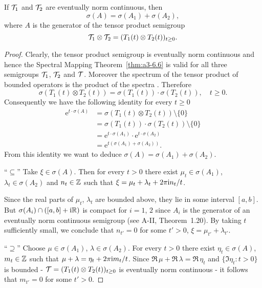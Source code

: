 \begin{corollary}\label{cor:a3-6.8}
If $\mathcal{T}_{1}$ and $\mathcal{T}_{2}$ are eventually norm continuous, then
\[
	\sigma(A) = \sigma(A_{1}) + \sigma(A_{2}) ,
\]
where $A$ is the generator of the tensor product semigroup
\[
	\mathcal{T}_{1} \otimes \mathcal{T}_{2} = (T_{1}(t) \otimes T_{2}(t))_{t\geq 0} .
\]
\end{corollary}
\begin{proof}
Clearly, the tensor product semigroup is eventually norm continuous and hence the Spectral Mapping Theorem~\ref{thm:a3-6.6} is valid for all three semigroups $\mathcal{T}_{1}$, $\mathcal{T}_{2}$ and $\mathcal{T}$.
Moreover the spectrum of the tensor product of bounded operators is the product of the spectra \citet[XIII.9]{reedsimon:1978}.
Therefore
\[
	\sigma(T_{1}(t)\otimes T_{2}(t)) = \sigma(T_{1}(t))\cdot\sigma(T_{2}(t)), \quad t \geq 0 .
\]
Consequently we have the following identity for every $t \geq 0$ 
\begin{align*}
\mathrm{e}^{t\cdot\sigma(A)} &= \sigma(T_{1}(t)\otimes T_{2}(t)) \setminus \{0\} \\
&= \sigma(T_{1}(t))\cdot\sigma(T_{2}(t)) \setminus \{0\} \\
&= \mathrm{e}^{t\cdot\sigma(A_{1})}\cdot \mathrm{e}^{t\cdot\sigma(A_{2})} \\
&= \mathrm{e}^{t(\sigma(A_{1})+\sigma(A_{2}))} .
\end{align*}
From this identity we want to deduce $\sigma(A) = \sigma(A_{1}) + \sigma(A_{2})$.

\enquote{$\subseteq$}\quad 
Take $\xi \in \sigma(A)$.
Then for every $t > 0$ there exist $\mu_{t} \in \sigma(A_{1})$, $\lambda_{t} \in \sigma(A_{2})$ and $n_{t} \in \mathbb{Z}$ such that $\xi = \mu_{t} + \lambda_{t} + 2\pi\mathrm{i}  n_{t}/t$.

Since the real parts of $\mu_{t}$, $\lambda_{t}$ are bounded above, they lie in some interval $[a,b]$.
But $\sigma(A_{i}) \cap ([a,b] + \mathrm{i}\mathbb{R})$ is compact for $i = 1$, $2$  since $A_{i}$ is the generator of an eventually norm continuous semigroup (see A-II, Theorem~1.20).
By taking $t$ sufficiently small, we conclude that $n_{t'} = 0$ for some $t' > 0$, \ie $\xi = \mu_{t'} + \lambda_{t'}$.

\enquote{$\supseteq$}\quad 
Choose $\mu \in \sigma(A_{1})$, $\lambda \in \sigma(A_{2})$.
For every $t > 0$ there exist $\eta_{t} \in \sigma(A)$, $m_{t} \in \mathbb{Z}$ such that $\mu + \lambda = \eta_{t} + 2\pi \mathrm{i} m_{t}/t$.
Since $\Re\,\mu + \Re\,\lambda = \Re\,\eta_{t}$ and $\{\Im \eta_{t}: t > 0\}$ is bounded - $\mathcal{T} = (T_{1}(t) \otimes T_{2}(t))_{t\geq 0}$ is eventually norm continuous - it follows that $m_{t'} = 0$ for some $t' > 0$.
\end{proof}
